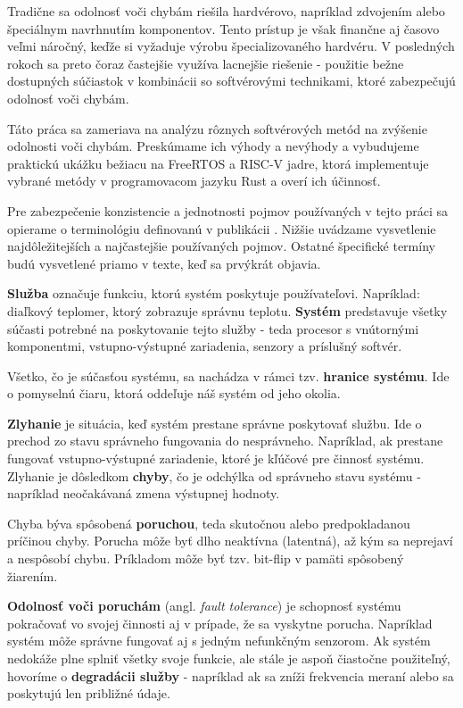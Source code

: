 \documentclass[12pt, letterpaper]{article}
\begin{document}
Tradične sa odolnosť voči chybám riešila hardvérovo, napríklad zdvojením alebo špeciálnym navrhnutím komponentov. Tento prístup je však finančne aj časovo veľmi náročný, keďže si vyžaduje výrobu špecializovaného hardvéru. V posledných rokoch sa preto čoraz častejšie využíva lacnejšie riešenie - použitie bežne dostupných súčiastok v kombinácii so softvérovými technikami, ktoré zabezpečujú odolnosť voči chybám.

Táto práca sa zameriava na analýzu rôznych softvérových metód na zvýšenie odolnosti voči chybám. Preskúmame ich výhody a nevýhody a vybudujeme praktickú ukážku bežiacu na FreeRTOS a RISC-V jadre, ktorá implementuje vybrané metódy v programovacom jazyku Rust a overí ich účinnosť.

Pre zabezpečenie konzistencie a jednotnosti pojmov používaných v tejto práci sa opierame o terminológiu definovanú v publikácii \cite{1335465}. Nižšie uvádzame vysvetlenie najdôležitejších a najčastejšie používaných pojmov. Ostatné špecifické termíny budú vysvetlené priamo v texte, keď sa prvýkrát objavia.

\textbf{Služba} označuje funkciu, ktorú systém poskytuje používateľovi. Napríklad: diaľkový teplomer, ktorý zobrazuje správnu teplotu. \textbf{Systém} predstavuje všetky súčasti potrebné na poskytovanie tejto služby - teda procesor s vnútornými komponentmi, vstupno-výstupné zariadenia, senzory a príslušný softvér.

Všetko, čo je súčasťou systému, sa nachádza v rámci tzv. \textbf{hranice systému}. Ide o pomyselnú čiaru, ktorá oddeľuje náš systém od jeho okolia.

\textbf{Zlyhanie} je situácia, keď systém prestane správne poskytovať službu. Ide o prechod zo stavu správneho fungovania do nesprávneho. Napríklad, ak prestane fungovať vstupno-výstupné zariadenie, ktoré je kľúčové pre činnosť systému. Zlyhanie je dôsledkom \textbf{chyby}, čo je odchýlka od správneho stavu systému - napríklad neočakávaná zmena výstupnej hodnoty.

Chyba býva spôsobená \textbf{poruchou}, teda skutočnou alebo predpokladanou príčinou chyby. Porucha môže byť dlho neaktívna (latentná), až kým sa neprejaví a nespôsobí chybu. Príkladom môže byť tzv. bit-flip v pamäti spôsobený žiarením.

\textbf{Odolnosť voči poruchám} (angl. \textit{fault tolerance}) je schopnosť systému pokračovať vo svojej činnosti aj v prípade, že sa vyskytne porucha. Napríklad systém môže správne fungovať aj s jedným nefunkčným senzorom. Ak systém nedokáže plne splniť všetky svoje funkcie, ale stále je aspoň čiastočne použiteľný, hovoríme o \textbf{degradácii služby} - napríklad ak sa zníži frekvencia meraní alebo sa poskytujú len približné údaje.
\end{document}
